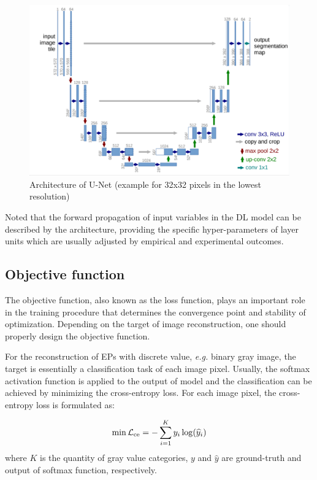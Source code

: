 \begin{figure}[h]
  \centering
  \includegraphics[width=0.99\columnwidth]{figures/UNet.pdf}
  \caption{Architecture of U-Net (example for 32x32 pixels in the lowest resolution)\cite{ronneberger2015unet}}\label{fig:UNet}
\end{figure}

Noted that the forward propagation of input variables in the DL model can be described by the architecture, providing the specific hyper-parameters of layer units which are usually adjusted by empirical and experimental outcomes.

\subsection{Objective function}
\label{subsec:Objective function}

The objective function, also known as the loss function, plays an important role in the training procedure that determines the convergence point and stability of optimization.
Depending on the target of image reconstruction, one should properly design the objective function.

For the reconstruction of EPs with discrete value\cite{Zhu2021Deep,Xiao2018Deep}, \emph{e.g.} binary gray image, the target is essentially a classification task of each image pixel. Usually, the softmax activation function is applied to the output of model and the classification can be achieved by minimizing the cross-entropy loss. For each image pixel, the cross-entropy loss is formulated as:

\begin{equation}\label{equ:crossentropy}
\mathop {\min }\limits_{} {\cal{L}_{{\rm{ce}}}} =  - \sum\limits_{i = 1}^K {{y_i}\log ({{\widehat y}_i})}
\end{equation}
where $K$ is the quantity of gray value categories, $y$ and $\widehat y$ are ground-truth and output of softmax function, respectively.

